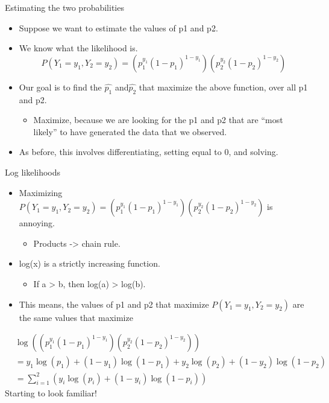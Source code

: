 \documentclass[aspectratio=169]{../latex_main/tntbeamer}  %
\begin{document}
	
	\begin{frame}{Estimating the two probabilities}
	   \begin{itemize}
	       \item Suppose we want to estimate the values of p1 and p2.
	       \item We know what the likelihood is.
	   \begin{equation*}
	       P(Y_1 = y_1, Y_2 = y_2) = (p_1^{y_1}(1- p_1)^{1-y_1})(p_2^{y_2}(1 - p_2)^{1 -y_2})
	   \end{equation*}
	   \item Our goal is to find the $\hat{p_1}$ and$\hat{p_2}$ that maximize the above function, over all p1 and p2.
	   \begin{itemize}
	       \item Maximize, because we are looking for the p1 and p2 that are “most likely” to have generated the data that we observed.
	   \end{itemize}
	   \item As before, this involves differentiating, setting equal to 0, and solving.
	   \end{itemize}
	\end{frame}
	
	
	
	\begin{frame}{Log likelihoods}
	   \begin{itemize}
	       \item Maximizing     $P(Y_1 = y_1, Y_2 = y_2) = (p_1^{y_1}(1- p_1)^{1-y_1})(p_2^{y_2}(1 - p_2)^{1 -y_2})$ is annoying. 
	       \begin{itemize}
	           \item Products -> chain rule.
	       \end{itemize}
	   \item log(x) is a strictly increasing function.
	   \begin{itemize}
	       \item If a > b, then log(a) > log(b).
	   \end{itemize}
	   \item This means, the values of p1 and p2 that maximize      $P(Y_1 = y_1, Y_2 =y_2)$                           are the same values that maximize
	   \end{itemize}
	   \begin{align*}
	        &\log ((p_1^{y_1}(1- p_1)^{1-y_1})(p_2^{y_2}(1 - p_2)^{1 -y_2}))\\
	        &= y_1\log(p_1) + (1 - y_1)\log(1-p_1) + y_2\log (p_2) + (1 - y_2)\log(1-p_2)\\
	        &= \sum\limits_{i=1}^2(y_i\log(p_i) + (1 - y_i)\log(1-p_i))
	   \end{align*}
	   Starting to look familiar!

	\end{frame}
	
\end{document}
